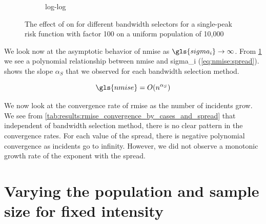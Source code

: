 \begin{figure}[htbp]
\begin{subfigure}[t]{0.24\textwidth}
        \caption{ log-log}
        \label{fig:ise:unif_Spreads_1h:nmise_log_log}
    \end{subfigure}
    \caption[: by risk ]
        {The effect of  on  for different bandwidth selectors for a single-peak risk function with \gls{factor} 100 on a uniform population of 10,000}
    \label{fig:ise:unif_Spreads_1h}
\end{figure}

We look now at the asymptotic behavior of \gls{nmise} as $\gls{sigma_i} \to \infty$.
From \cref{fig:ise:unif_Spreads_1h:nmise_log_log} we see a polynomial relationship between \gls{nmise} and \gls{sigma_i} (\cref{eq:nmise:spread}).
 shows the slope $\alpha_S$ that we observed for each bandwidth selection method.

\begin{equation}
    \label{eq:nmise:spread}
    \gls{nmise} = O(n^{\alpha_S})
\end{equation}


We now look at the convergence rate of \gls{rmise} as the number of incidents grow.
We see from \cref{tab:results:rmise_convergence_by_cases_and_spread} that independent of bandwidth selection method,
there is no clear pattern in the convergence rates.
For each value of the \gls{spread}, there is negative polynomial convergence as incidents go to infinity.
However, we did not observe a monotonic growth rate of the exponent with the spread.




\section{Varying the population and sample size for fixed intensity}
\label{sec:results:unifNpop_1h}

